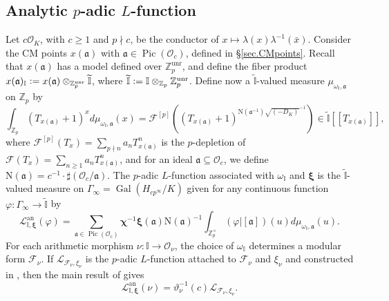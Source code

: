 \documentclass[a4paper,11pt]{amsart}
\numberwithin{equation}{section}
\theoremstyle{plain}
\theoremstyle{definition}
\theoremstyle{remark}
\newcommand{\Z}{\mathbb Z}
\newcommand{\I}{\mathbb{I}}
\newcommand{\defeq}{\vcentcolon=}
\DeclareMathOperator{\Pic}{Pic}
\DeclareMathOperator{\Gal}{Gal}
\newcommand{\unr}{\mathrm{unr}}
\begin{document}
\subsection{Analytic $p$-adic $L$-function} Let $c\mathcal{O}_K$, with $c\geq 1$ and $p\nmid c$, be the conductor of $x \mapsto\lambda(x)\lambda^{-1}(\bar{x})$.
Consider the CM points $x(\mathfrak{a})$ with $\mathfrak{a} \in \Pic(\mathcal{O}_c)$, defined in \S \ref{sec.CMpoints}.
Recall that $x(\mathfrak{a})$ has a model defined over ${\Z_p^\unr}$, and define 
the fiber product $x(\mathfrak{a})_{{\I}} \defeq x(\mathfrak{a}) \otimes_{\Z_p^\unr}\widetilde{\I}$, where $\widetilde{\I}\defeq \I\otimes_{\Z_p}\Z_p^{\unr}$.
Define now a $\widetilde{\I}$-valued measure $\mu_{\omega_\I,\mathfrak{a}}$ on $\Z_p$ by
\begin{equation*} \label{mu_a}
\int_{\Z_p} (T_{x(\mathfrak{a})}+1)^x d\mu_{\omega_\I,\mathfrak{a}}(x) = 
\boldsymbol{\mathcal{F}}^{[p]} \left( (T_{x(\mathfrak{a})}+1)^{\mathrm{N}(\mathfrak{a}^{-1})\sqrt{(-D_K)}^{-1}}\right) \in \widetilde{\I}[[T_{x(\mathfrak{a})}]],
\end{equation*}
where 
$\boldsymbol{\mathcal{F}}^{[p]}(T_x)=\sum_{p\nmid n}a_nT_{x(\mathfrak{a})}^n$ is the $p$-depletion of $\boldsymbol{\mathcal{F}}(T_x)=\sum_{n\geq 1}a_nT_{x(\mathfrak{a})}^n$, and for an ideal $\mathfrak{a}\subseteq\mathcal{O}_c$, we define $\mathrm{N}(\mathfrak{a})=c^{-1}\cdot\sharp(\mathcal{O}_c/\mathfrak{a})$.
The $p$-adic $L$-function associated with $\omega_\I$ and $\boldsymbol{\xi}$ is the $\widetilde{\I}$-valued measure on  
$\Gamma_\infty=\Gal(H_{cp^{\infty}}/K)$ given for any continuous function $\varphi\colon\Gamma_\infty\rightarrow \widetilde{\I}$ by 
\[
\mathscr{L}_{\I,\boldsymbol{\xi}}^\mathrm{an} (\varphi) = \sum_{\mathfrak{a} \in \Pic(\mathcal O_{c})}
{\boldsymbol{\chi}}^{-1}
{\boldsymbol{\xi}}(\mathfrak{a})
\mathrm{N}(\mathfrak{a})^{-1}
	\int_{\Z_p^{\times}} 
	(\varphi \big|[\mathfrak{a}])(u)d\mu_{\omega_\I,\mathfrak{a}}(u).
	\]
For each arithmetic morphism $\nu\colon\I\rightarrow\mathcal{O}_\nu$, the choice of $\omega_\I$ determines 
a modular form $\mathcal{F}_\nu$. If $\mathscr{L}_{\mathcal{F}_\nu,\xi_\nu}$ is the $p$-adic $L$-function attached to $\mathcal{F}_\nu$ and $\xi_\nu$ and constructed in \cite{Magrone}, then the main result of \cite{LMW} gives 
\begin{equation}\label{int-1}
\mathscr{L}_{\I,\boldsymbol{\xi}}^\mathrm{an} (\nu)=\vartheta_\nu^{-1}(c)\mathscr{L}_{\mathcal{F}_\nu,\xi_\nu}.\end{equation}
\end{document}

